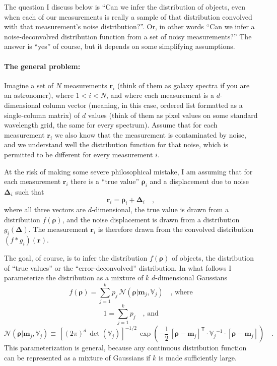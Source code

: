 \documentclass[12pt]{article}
\newcommand{\Mvector}[1]{\boldsymbol{#1}}
\newcommand{\measurement}{\Mvector{r}}
\newcommand{\truepoint}{\Mvector{\rho}}
\newcommand{\noise}{\Mvector{\Delta}}
\newcommand{\measurementi}{\measurement_i}
\newcommand{\truepointi}{\truepoint_i}
\newcommand{\noisei}{\noise_i}
\newcommand{\mean}{\Mvector{m}}
\newcommand{\meanj}{\mean_j}
\newcommand{\truedist}{f}
\newcommand{\noisedisti}{g_i}
\newcommand{\gaussian}{\mathcal{N}\!}
\newcommand{\ampj}{p_j}
\newcommand{\Mmatrix}[1]{\mathbb{#1}}
\newcommand{\varj}{\Mmatrix{V}_j}
\newcommand{\inverse}[1]{{#1}^{-1}}
\newcommand{\invvarj}{\inverse{\varj}}
\newcommand{\transpose}[1]{{#1}^{\mathsf{T}}}
\begin{document}
The question I discuss below is ``Can we infer the distribution of
objects, even when each of our measurements is really a sample of that
distribution convolved with that measurement's noise distribution?''.
Or, in other words ``Can we infer a noise-deconvolved distribution
function from a set of noisy measurements?''  The answer is ``yes'' of
course, but it depends on some simplifying assumptions.

\paragraph{The general problem:}
Imagine a set of $N$ measurements $\measurementi$ (think of them as
galaxy spectra if you are an astronomer), where $1<i<N$, and where
each measurement is a $d$-dimensional column vector (meaning, in this
case, ordered list formatted as a single-column matrix) of $d$ values
(think of them as pixel values on some standard wavelength grid, the
same for every spectrum).  Assume that for each measurement
$\measurementi$ we also know that the measurement is contaminated by
noise, and we understand well the distribution function for that
noise, which is permitted to be different for every measurement $i$.

At the risk of making some severe philosophical mistake, I am assuming
that for each measurement $\measurementi$ there is a ``true value''
$\truepointi$ and a displacement due to noise $\noisei$ such that
\begin{equation}
\measurementi=\truepointi+\noisei
\quad ,
\end{equation}
where all three vectors are $d$-dimensional, the true value is drawn
from a distribution $\truedist(\truepoint)$, and the noise displacement is
drawn from a distribution $\noisedisti(\noise)$.  The measurement
$\measurementi$ is therefore drawn from the convolved distribution
$(\truedist * \noisedisti)(\measurement)$.

The goal, of course, is to infer the distribution
$\truedist(\truepoint)$ of objects, the distribution of ``true
values'' or the ``error-deconvolved'' distribution.  In what follows I
parameterize the distribution as a mixture of $k$ $d$-dimensional
Gaussians
\begin{equation}
\truedist(\truepoint) =
  \sum_{j=1}^k\ampj\,\gaussian(\truepoint|\meanj,\varj)
\quad \mbox{, where}
\end{equation}
\begin{equation}
1 = \sum_{j=1}^k\ampj
\quad \mbox{, and}
\end{equation}
\begin{equation}
\gaussian(\truepoint|\meanj,\varj) \equiv
  \,\left[(2\pi)^d\,\det(\varj)\right]^{-1/2}
  \,\exp\left(-\frac{1}{2}\,\transpose{[\truepoint-\meanj]}
              \cdot\invvarj\cdot[\truepoint-\meanj]\right)
\quad .
\end{equation}
This parameterization is general, because any continuous distribution
function can be represented as a mixture of Gaussians if $k$ is made
sufficiently large.
\end{document}
